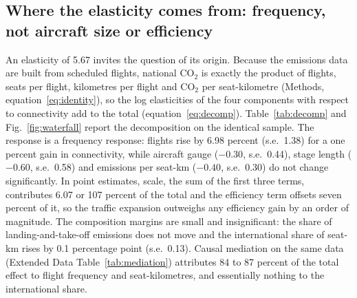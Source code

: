 \documentclass[12pt]{article}
\begin{document}
\subsection*{Where the elasticity comes from: frequency, not aircraft size
or efficiency}
An elasticity of 5.67 invites the question of its origin. Because the
emissions data are built from scheduled flights, national CO$_2$ is
exactly the product of flights, seats per flight, kilometres per flight and
CO$_2$ per seat-kilometre (Methods, equation~\ref{eq:identity}), so the
log elasticities of the four components with respect to connectivity add
to the total (equation~\ref{eq:decomp}). Table~\ref{tab:decomp} and
Fig.~\ref{fig:waterfall} report the decomposition on the identical sample.
The response is a frequency response: flights rise by 6.98 percent (s.e.\
1.38) for a one percent gain in connectivity, while aircraft gauge
($-0.30$, s.e.\ 0.44), stage length ($-0.60$, s.e.\ 0.58) and emissions
per seat-km ($-0.40$, s.e.\ 0.30) do not change significantly. In point
estimates, scale, the sum of the first three terms, contributes 6.07 or
107 percent of the total and the efficiency term offsets seven percent of
it, so the traffic expansion outweighs any efficiency gain by an order of
magnitude. The composition margins are small and insignificant: the share
of landing-and-take-off emissions does not move and the international
share of seat-km rises by 0.1 percentage point (s.e.\ 0.13). Causal
mediation on the same data (Extended Data Table~\ref{tab:mediation})
attributes 84 to 87 percent of the total effect to flight frequency and
seat-kilometres, and essentially nothing to the international share.
\end{document}
